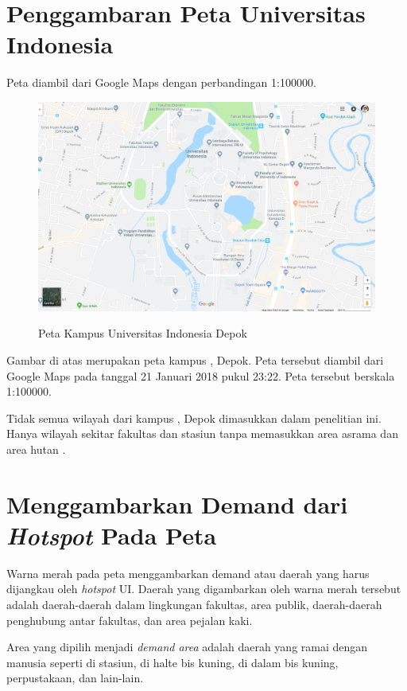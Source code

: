 \section{Penggambaran Peta Universitas Indonesia}
Peta {\ui} diambil dari Google Maps dengan perbandingan 1:100000.

\begin{figure}
	\centering
	\includegraphics[width=12cm]{pics/ui.png}
	\caption{Peta Kampus Universitas Indonesia Depok}
	\label{fig:ui}
	\cite{ui.map}
\end{figure} 

Gambar di atas merupakan peta kampus {\ui}, Depok. Peta tersebut diambil dari Google Maps pada tanggal 21 Januari 2018 pukul 23:22. Peta tersebut berskala 1:100000.

Tidak semua wilayah dari kampus {\ui}, Depok dimasukkan dalam penelitian ini. Hanya wilayah sekitar fakultas dan stasiun tanpa memasukkan area asrama {\ui} dan area hutan {\ui}.

\section{Menggambarkan Demand dari \textit{Hotspot} Pada Peta}

Warna merah pada peta menggambarkan demand atau daerah yang harus dijangkau oleh \textit{hotspot} UI. Daerah yang digambarkan oleh warna merah tersebut adalah daerah-daerah dalam lingkungan fakultas, area publik, daerah-daerah penghubung antar fakultas, dan area pejalan kaki.

Area yang dipilih menjadi \textit{demand area} adalah daerah yang ramai dengan manusia seperti di stasiun, di halte bis kuning, di dalam bis kuning, perpustakaan, dan lain-lain.

